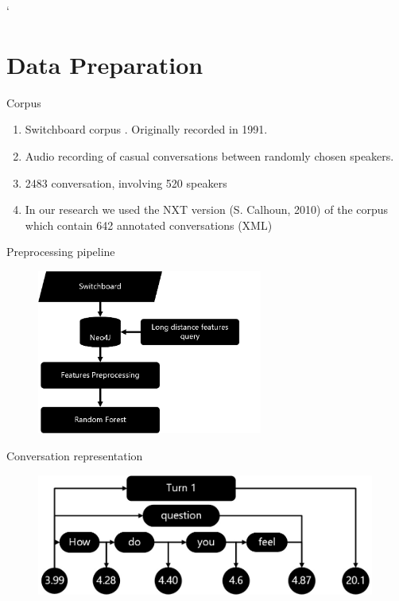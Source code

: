 `%

\section{Data Preparation}
\frame{\sectionpage}


\begin{frame}{Corpus}
    \begin{enumerate}[<+->]\itemsep9pt
      \item Switchboard corpus . Originally recorded in 1991. 
      \item Audio recording of casual conversations between randomly chosen speakers.
      \item 2483 conversation, involving 520 speakers
      \item In our research we used the NXT version (S. Calhoun, 2010) of the corpus which contain 642 annotated conversations (XML)
    \end{enumerate}

\end{frame}{}


\begin{frame}{Preprocessing pipeline}
\begin{figure}[ht!]
\centering
\includegraphics[width=20em]{../latex/pipeline.jpg}\vspace{-1em}
\end{figure}
\end{frame}


\begin{frame}{Conversation representation}
\begin{figure}[ht!]
\centering
\includegraphics[width=30em]{../latex/graph5.jpg}\vspace{-1em}
\end{figure}
\end{frame}



